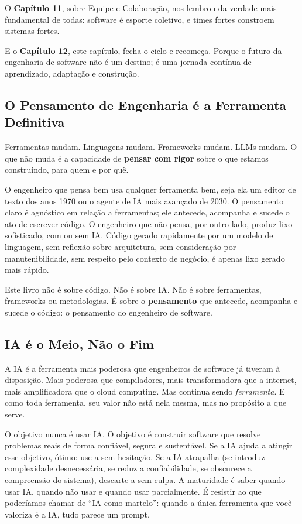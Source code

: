 O \textbf{Capítulo 11}, sobre Equipe e Colaboração, nos lembrou da verdade mais fundamental de todas: software é esporte coletivo, e times fortes constroem sistemas fortes.

E o \textbf{Capítulo 12}, este capítulo, fecha o ciclo e recomeça. Porque o futuro da engenharia de software não é um destino; é uma jornada contínua de aprendizado, adaptação e construção.

\subsection{O Pensamento de Engenharia é a Ferramenta Definitiva}

Ferramentas mudam. Linguagens mudam. Frameworks mudam. LLMs mudam. O que não muda
é a capacidade de \textbf{pensar com rigor} sobre o que estamos construindo, para
quem e por quê.

O engenheiro que pensa bem usa qualquer ferramenta bem, seja ela um editor de texto dos anos 1970 ou o agente de IA mais avançado de 2030. O pensamento claro é agnóstico em relação a ferramentas; ele antecede, acompanha e sucede o ato de escrever código. O engenheiro que não pensa, por outro lado, produz lixo sofisticado, com ou sem IA. Código gerado rapidamente por um modelo de linguagem, sem reflexão sobre arquitetura, sem consideração por manutenibilidade, sem respeito pelo contexto de negócio, é apenas lixo gerado mais rápido.

Este livro não é sobre código. Não é sobre IA. Não é sobre ferramentas, frameworks ou metodologias. É sobre o \textbf{pensamento} que antecede, acompanha e sucede o código: o pensamento do engenheiro de software.

\subsection{IA é o Meio, Não o Fim}

A IA é a ferramenta mais poderosa que engenheiros de software já tiveram à disposição. Mais poderosa que compiladores, mais transformadora que a internet, mais amplificadora que o cloud computing. Mas continua sendo \textit{ferramenta}. E como toda ferramenta, seu valor não está nela mesma, mas no propósito a que serve.

O objetivo nunca é usar IA. O objetivo é construir software que resolve problemas reais de forma confiável, segura e sustentável. Se a IA ajuda a atingir esse objetivo, ótimo: use-a sem hesitação. Se a IA atrapalha (se introduz complexidade desnecessária, se reduz a confiabilidade, se obscurece a compreensão do sistema), descarte-a sem culpa. A maturidade é saber quando usar IA, quando não usar e quando usar parcialmente. É resistir ao que poderíamos chamar de ``IA como martelo'': quando a única ferramenta que você valoriza é a IA, tudo parece um prompt.

